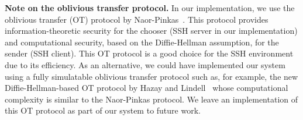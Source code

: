 
\vspace{1ex}
\noindent
\textbf{Note on the oblivious transfer protocol.}
In our implementation, we use the oblivious transfer (OT) protocol
by Naor-Pinkas~\cite{Naor-Pinkas:2001}. This protocol provides
information-theoretic security for the chooser (SSH server in our
implementation) and computational security, based on the Diffie-Hellman
assumption, for the sender (SSH client).  This OT protocol is a good
choice for the SSH environment due to its efficiency.  As an alternative,
we could have implemented our system using a fully simulatable oblivious
transfer protocol such as, for example, the new Diffie-Hellman-based OT
protocol by Hazay and Lindell~\cite{Hazay-Lindell} whose computational
complexity is similar to the Naor-Pinkas protocol.  We leave an
implementation of this OT protocol as part of our system to future work.




